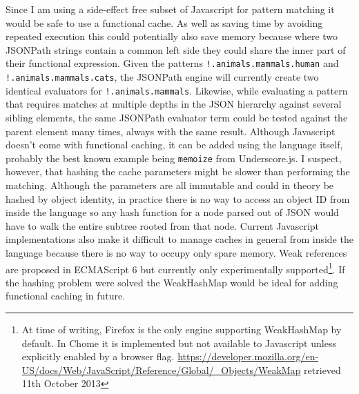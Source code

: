 \documentclass[12pt, ]{article}
\begin{document}
Since I am using a side-effect free subset of Javascript for pattern
matching it would be safe to use a functional cache. As well as saving
time by avoiding repeated execution this could potentially also save
memory because where two JSONPath strings contain a common left side
they could share the inner part of their functional expression. Given
the patterns \texttt{!.animals.mammals.human} and
\texttt{!.animals.mammals.cats}, the JSONPath engine will currently
create two identical evaluators for \texttt{!.animals.mammals}.
Likewise, while evaluating a pattern that requires matches at multiple
depths in the JSON hierarchy against several sibling elements, the same
JSONPath evaluator term could be tested against the parent element many
times, always with the same result. Although Javascript doesn't come
with functional caching, it can be added using the language itself,
probably the best known example being \texttt{memoize} from
Underscore.js. I suspect, however, that hashing the cache parameters
might be slower than performing the matching. Although the parameters
are all immutable and could in theory be hashed by object identity, in
practice there is no way to access an object ID from inside the language
so any hash function for a node parsed out of JSON would have to walk
the entire subtree rooted from that node. Current Javascript
implementations also make it difficult to manage caches in general from
inside the language because there is no way to occupy only spare memory.
Weak references are proposed in ECMAScript 6 but currently only
experimentally supported\footnote{At time of writing, Firefox is the
  only engine supporting WeakHashMap by default. In Chome it is
  implemented but not available to Javascript unless explicitly enabled
  by a browser flag.
  \url{https://developer.mozilla.org/en-US/docs/Web/JavaScript/Reference/Global/_Objects/WeakMap}
  retrieved 11th October 2013}. If the hashing problem were solved the
WeakHashMap would be ideal for adding functional caching in future.
\end{document}
